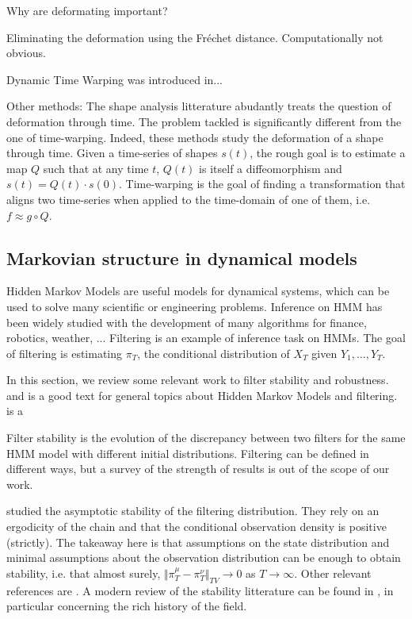 Why are deformating important?

Eliminating the deformation using the Fréchet distance. Computationally not obvious.

Dynamic Time Warping was introduced in...


Other methods: The shape analysis litterature \cite{younes} abudantly treats the question of deformation through time. The problem tackled is significantly different from the one of time-warping. Indeed, these methods study the deformation of a shape through time. Given a time-series of shapes $s(t)$, the rough goal is to estimate a map $Q$ such that at any time $t$, $Q(t)$ is itself a diffeomorphism and $s(t) = Q(t) \cdot s(0)$. Time-warping is the goal of finding a transformation that aligns two time-series when applied to the time-domain of one of them, i.e. $f \approx g \circ Q$.

\subsection{Markovian structure in dynamical models}
Hidden Markov Models are useful models for dynamical systems, which can be used to solve many scientific or engineering problems. Inference on HMM has been widely studied with the development of many algorithms for finance, robotics, weather, ... Filtering is an example of inference task on HMMs. The goal of filtering is estimating $\pi_T$, the conditional distribution of $X_T$ given $Y_1, \ldots, Y_T$.

In this section, we review some relevant work to filter stability and robustness.
\cite{cappehmm} and \cite{Saarka} is a good text for general topics about Hidden Markov Models and filtering. \cite{saarka} is a


Filter stability is the evolution of the discrepancy between two filters for the same HMM model with different initial distributions. Filtering can be defined in different ways, but a survey of the strength of results is out of the scope of our work.

\cite{ocone} studied the asymptotic stability of the filtering distribution. They rely on an ergodicity of the chain and that the conditional observation density is positive (strictly). The takeaway here is that assumptions on the state distribution and minimal assumptions about the observation distribution can be enough to obtain stability, i.e. that almost surely, $\Vert \pi_T^\mu - \pi^\nu_T\Vert_{TV} \to 0$ as $T\to\infty$. Other relevant references are \cite{atar,chigansky,mcdonald}.
A modern review of the stability litterature can be found in \cite{kimphd}, in particular concerning the rich history of the field.

